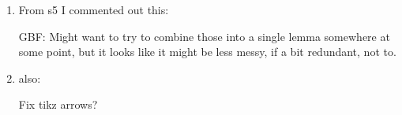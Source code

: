 \begin{enumerate}
	\item From s5 I commented out this:

	GBF: Might want to try to combine those into a single lemma somewhere at some point, but it looks like it might be less messy, if a bit redundant, not to.

	\item also:

	Fix tikz arrows?

\begin{comment}
	\item \sout{Picture for creasing.}
	\item Compactness and orientation assumptions on Theorem 3.13 (transversality constrains preserve q-iso type).

	\item \sout{Treatment of creasing.}
	\item Guillemin-Pollock for mnfds with corner.

	\item Clarify isomorphisms used in orientations and make more explicit how the Lipyanskiy orientations fit.


	\item More on Mayer-Vietoris - check full argument
	\item Poincar\'e Lemma - check new proof
	\item (Anibal) Add a better treatment of ``cst" from \verb|Flows/old/pd_cubical_S2.Feb16.tex| \\
	Greg: Let K be any finite set of cubical faces and let L be a single cubical face. We need $cst(K) \cup cst(L)$ to be $cst(K \cup L)$ (maybe this part is just by definition?) and we need $cst(K) \cap cst(L)$ to be $cst(K ? L)$ where $K ? L$ needs to be some set of faces with cardinality less than or equal to that of K.
\end{comment}

	\begin{comment}
		\item \sout{Picture for creasing.}
		\item Compactness and orientation assumptions on Theorem 3.13 (transversality constrains preserve q-iso type).

		\item \sout{Treatment of creasing.}
		\item Guillemin-Pollock for mnfds with corner.

		\item Clarify isomorphisms used in orientations and make more explicit how the Lipyanskiy orientations fit.


\end{comment}
\end{enumerate}

